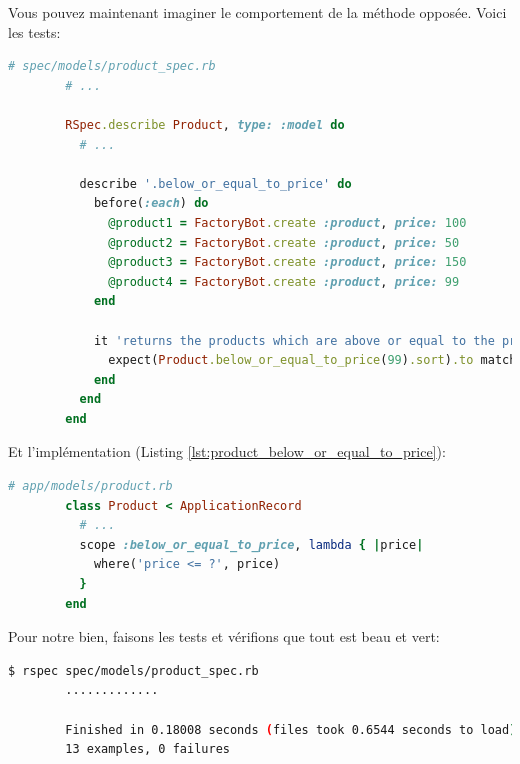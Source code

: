 \documentclass[]{report}
\begin{document}
      Vous pouvez maintenant imaginer le comportement de la méthode opposée. Voici les tests:

      \begin{scriptsize}
        \begin{lstlisting}[language=ruby, caption={Test du filtrage des produits par prix inférieur ou égal}, label={lst:product_below_or_equal_to_price_spec}]
        # spec/models/product_spec.rb
        # ...

        RSpec.describe Product, type: :model do
          # ...

          describe '.below_or_equal_to_price' do
            before(:each) do
              @product1 = FactoryBot.create :product, price: 100
              @product2 = FactoryBot.create :product, price: 50
              @product3 = FactoryBot.create :product, price: 150
              @product4 = FactoryBot.create :product, price: 99
            end

            it 'returns the products which are above or equal to the price' do
              expect(Product.below_or_equal_to_price(99).sort).to match_array([@product2, @product4])
            end
          end
        end
        \end{lstlisting}
      \end{scriptsize}

      Et l'implémentation (Listing \ref{lst:product_below_or_equal_to_price}):

      \begin{scriptsize}
        \begin{lstlisting}[language=ruby, caption={Implémentation du filtrage des produits par prix supérieur ou égal}, label={lst:product_below_or_equal_to_price}]
        # app/models/product.rb
        class Product < ApplicationRecord
          # ...
          scope :below_or_equal_to_price, lambda { |price|
            where('price <= ?', price)
          }
        end
        \end{lstlisting}
      \end{scriptsize}

      Pour notre bien, faisons les tests et vérifions que tout est beau et vert:

      \begin{scriptsize}
        \begin{lstlisting}[language=bash]
        $ rspec spec/models/product_spec.rb
        .............

        Finished in 0.18008 seconds (files took 0.6544 seconds to load)
        13 examples, 0 failures
        \end{lstlisting}
      \end{scriptsize}
\end{document}
